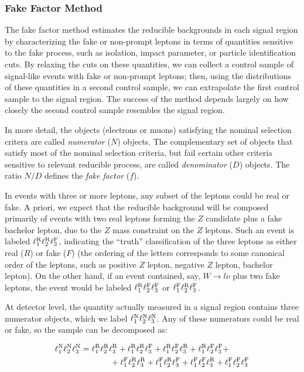\subsubsection{Fake Factor Method}\label{sec:fake-factor-method}
The fake factor method estimates the reducible backgrounds in each signal region by characterizing the fake or non-prompt leptons in terms of quantities sensitive to the fake process, such as isolation, impact parameter, or particle identification cuts. By relaxing the cuts on these quantities, we can collect a control sample of signal-like events with fake or non-prompt leptons; then, using the distributions of these quantities in a second control sample, we can extrapolate the first control sample to the signal region. The success of the method depends largely on how closely the second control sample resembles the signal region. 

In more detail, the objects (electrons or muons) satisfying the nominal selection critera are called \emph{numerator} ($N$) objects. The complementary set of objects that satisfy most of the nominal selection criteria, but fail certain other criteria sensitive to relevant reducible process, are called \emph{denominator} ($D$) objects. The ratio $N/D$ defines the \emph{fake factor} ($f$). 

In events with three or more leptons, any subset of the leptons could be real or fake. A priori, we expect that the reducible background will be composed primarily of events with two real leptons forming the $Z$ candidate plus a fake bachelor lepton, due to the $Z$ mass constraint on the $Z$ leptons. Such an event is labeled $\ell_{1}^{\mathrm{R}}\ell_{2}^{\mathrm{R}}\ell_{3}^{\mathrm{F}}$, indicating the ``truth'' classification of the three leptons as either real ($R$) or fake ($F$) (the ordering of the letters corresponds to some canonical order of the leptons, such as positive $Z$ lepton, negative $Z$ lepton, bachelor lepton). On the other hand, if an event contained, say, $W\rightarrow l\nu$ plus two fake leptons, the event would be labeled $\ell_{1}^{\mathrm{R}}\ell_{2}^{\mathrm{F}}\ell_{3}^{\mathrm{F}}$ or $\ell_{1}^{\mathrm{F}}\ell_{2}^{\mathrm{R}}\ell_{3}^{\mathrm{F}}$. 

At detector level, the quantity actually measured in a signal region contains three numerator objects, which we label $\ell_{1}^{\mathrm{N}}\ell_{2}^{\mathrm{N}}\ell_{3}^{\mathrm{N}}$. Any of these numerators could be real or fake, so the sample can be decomposed as:

\begin{align}
	\ell_{1}^{\mathrm{N}}\ell_{2}^{\mathrm{N}}\ell_{3}^{\mathrm{N}} & = \ell_{1}^{\mathrm{R}}\ell_{2}^{\mathrm{R}}\ell_{3}^{\mathrm{R}} + \ell_{1}^{\mathrm{R}}\ell_{2}^{\mathrm{R}}\ell_{3}^{\mathrm{F}} + \ell_{1}^{\mathrm{R}}\ell_{2}^{\mathrm{F}}\ell_{3}^{\mathrm{R}} + \ell_{1}^{\mathrm{R}}\ell_{2}^{\mathrm{F}}\ell_{3}^{\mathrm{F}} +\\
	&  \hspace{0.5in} + \ell_{1}^{\mathrm{F}}\ell_{2}^{\mathrm{R}}\ell_{3}^{\mathrm{R}} + \ell_{1}^{\mathrm{F}}\ell_{2}^{\mathrm{R}}\ell_{3}^{\mathrm{F}} + \ell_{1}^{\mathrm{F}}\ell_{2}^{\mathrm{F}}\ell_{3}^{\mathrm{R}} + \ell_{1}^{\mathrm{F}}\ell_{2}^{\mathrm{F}}\ell_{3}^{\mathrm{F}}
\end{align}

